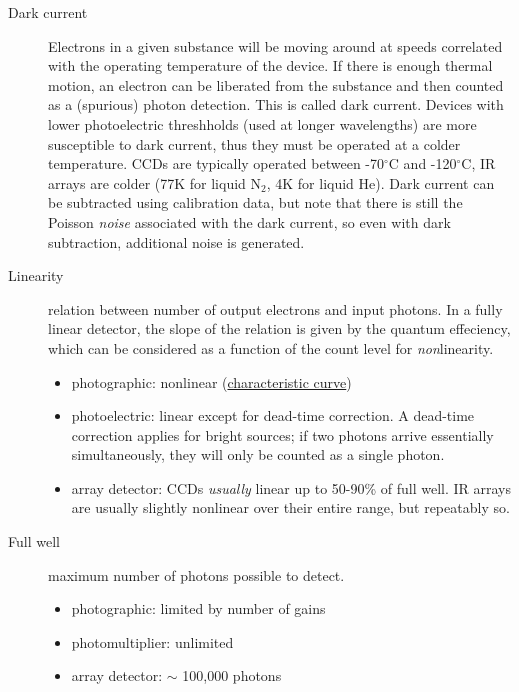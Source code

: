 \documentclass[12pt]{article}
\begin{document}
\begin{description}
    \item [Dark current] Electrons in a given substance will be moving
        around at speeds correlated with the operating
        temperature of the device. If there is enough thermal motion,
        an electron can be liberated from the substance and
        then counted as a (spurious) photon detection. This is called
        dark current. Devices with lower photoelectric threshholds
        (used at longer wavelengths) are more susceptible to dark
        current, thus they must be operated at a colder temperature.
        CCDs are typically operated between -70$^{\circ}$C and
        -120$^{\circ}$C, IR arrays
        are colder (77K for liquid N$_{2}$, 4K for liquid He). Dark current
        can be subtracted using calibration data, but note that
        there is still the Poisson \emph{noise} associated with the dark
        current, so even with dark subtraction, additional noise is
        generated.
    \item [Linearity] relation between number of output electrons and
        input photons. In a fully linear detector,
        the slope of the relation is given by the quantum
        effeciency, which can be considered as a function of the count
        level for \emph{non}linearity.
        \begin{itemize}
            \item photographic: nonlinear
                (\href{https://en.wikipedia.org/wiki/Sensitometry}
                {characteristic curve})
            \item photoelectric: linear except for dead-time correction.
                A dead-time correction applies for bright sources; if
                two photons arrive essentially simultaneously, they
                will only be counted as a single photon.
            \item array detector: CCDs \emph{usually} linear up to
                50-90\% of full well. IR arrays are usually slightly
                nonlinear over their entire range, but repeatably so.
        \end{itemize}
    \item [Full well] maximum number of photons possible to detect.
        \begin{itemize}
            \item photographic: limited by number of gains
            \item photomultiplier: unlimited
            \item array detector: $\sim$ 100,000 photons
        \end{itemize}
\end{description}
\end{document}

